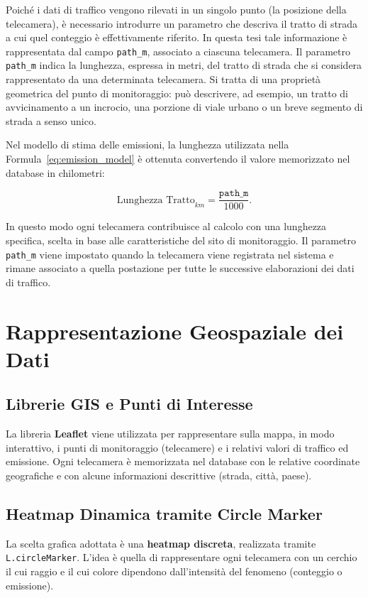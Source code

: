 \documentclass[12pt, oneside]{extbook}
\begin{document}
Poiché i dati di traffico vengono rilevati in un singolo punto
(la posizione della telecamera), è necessario introdurre un parametro che
descriva il tratto di strada a cui quel conteggio è effettivamente
riferito. In questa tesi tale informazione è rappresentata dal campo
\texttt{path\_m}, associato a ciascuna telecamera. Il parametro \texttt{path\_m} indica la lunghezza, espressa in metri,
del tratto di strada che si considera rappresentato da una determinata
telecamera. Si tratta di una proprietà geometrica del punto di
monitoraggio: può descrivere, ad esempio, un tratto di avvicinamento a
un incrocio, una porzione di viale urbano o un breve segmento di strada
a senso unico.

Nel modello di stima delle emissioni, la lunghezza utilizzata nella
Formula~\ref{eq:emission_model} è ottenuta convertendo il valore
memorizzato nel database in chilometri:

\[
  \text{Lunghezza Tratto}_{km} = \frac{\texttt{path\_m}}{1000}.
\]

In questo modo ogni telecamera contribuisce al calcolo con una lunghezza
specifica, scelta in base alle caratteristiche del sito di
monitoraggio. Il parametro \texttt{path\_m} viene impostato quando la
telecamera viene registrata nel sistema e rimane associato a quella
postazione per tutte le successive elaborazioni dei dati di traffico.

\section{Rappresentazione Geospaziale dei Dati}

\subsection{Librerie GIS e Punti di Interesse}

La libreria \textbf{Leaflet} viene utilizzata per rappresentare sulla mappa,
in modo interattivo, i punti di monitoraggio (telecamere) e i relativi valori
di traffico ed emissione. Ogni telecamera è memorizzata nel database con le
relative coordinate geografiche e con alcune informazioni descrittive (strada,
città, paese).

\subsection{Heatmap Dinamica tramite Circle Marker}

La scelta grafica adottata è una \textbf{heatmap discreta}, realizzata tramite
\texttt{L.circleMarker}. L'idea è quella di rappresentare ogni telecamera con
un cerchio il cui raggio e il cui colore dipendono dall'intensità del fenomeno
(conteggio o emissione).
\end{document}

